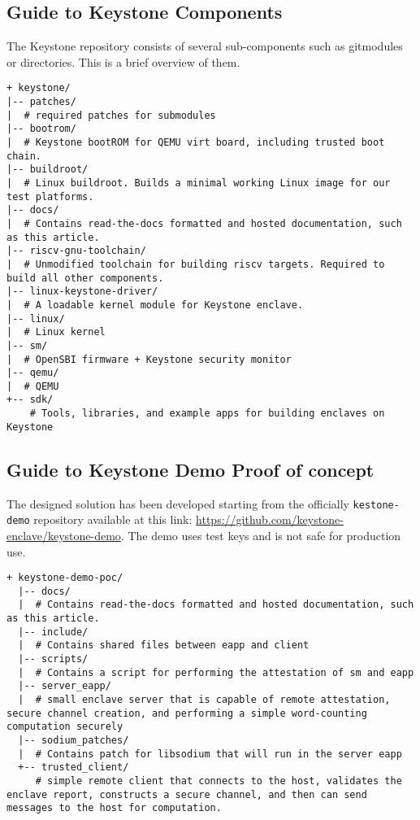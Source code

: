 \subsection*{Guide to Keystone Components}
The Keystone repository consists of several sub-components such as gitmodules or directories. This is a brief overview of them.
\begin{lstlisting}[frame=single]
+ keystone/
|-- patches/
|  # required patches for submodules
|-- bootrom/
|  # Keystone bootROM for QEMU virt board, including trusted boot chain.
|-- buildroot/
|  # Linux buildroot. Builds a minimal working Linux image for our test platforms.
|-- docs/
|  # Contains read-the-docs formatted and hosted documentation, such as this article.
|-- riscv-gnu-toolchain/
|  # Unmodified toolchain for building riscv targets. Required to build all other components.
|-- linux-keystone-driver/
|  # A loadable kernel module for Keystone enclave.
|-- linux/
|  # Linux kernel
|-- sm/
|  # OpenSBI firmware + Keystone security monitor
|-- qemu/
|  # QEMU
+-- sdk/
    # Tools, libraries, and example apps for building enclaves on Keystone        
\end{lstlisting}

\subsection*{Guide to Keystone Demo Proof of concept}
The designed solution has been developed starting from the officially \texttt{kestone-demo} repository available at this link: \url{https://github.com/keystone-enclave/keystone-demo}. The demo uses test keys and is not safe for production use.
\begin{lstlisting}[frame=single]
  + keystone-demo-poc/
  |-- docs/
  |  # Contains read-the-docs formatted and hosted documentation, such as this article.
  |-- include/
  |  # Contains shared files between eapp and client
  |-- scripts/
  |  # Contains a script for performing the attestation of sm and eapp
  |-- server_eapp/
  |  # small enclave server that is capable of remote attestation, secure channel creation, and performing a simple word-counting computation securely
  |-- sodium_patches/
  |  # Contains patch for libsodium that will run in the server eapp
  +-- trusted_client/
     # simple remote client that connects to the host, validates the enclave report, constructs a secure channel, and then can send messages to the host for computation.       
  \end{lstlisting}

